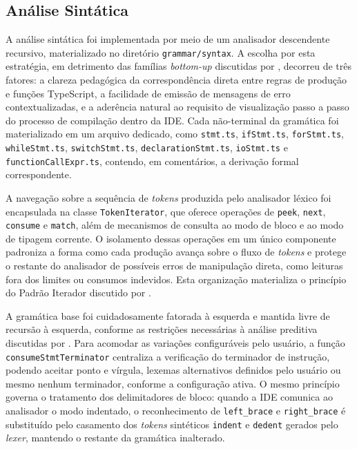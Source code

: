 \subsection{Análise Sintática}
\label{subsec:analise-sintatica}

A análise sintática foi implementada por meio de um analisador descendente recursivo, materializado no diretório \texttt{grammar/syntax}. A escolha por esta estratégia, em detrimento das famílias \textit{bottom-up} discutidas por , decorreu de três fatores: a clareza pedagógica da correspondência direta entre regras de produção e funções TypeScript, a facilidade de emissão de mensagens de erro contextualizadas, e a aderência natural ao requisito de visualização passo a passo do processo de compilação dentro da IDE. Cada não-terminal da gramática foi materializado em um arquivo dedicado, como \texttt{stmt.ts}, \texttt{ifStmt.ts}, \texttt{forStmt.ts}, \texttt{whileStmt.ts}, \texttt{switchStmt.ts}, \texttt{declarationStmt.ts}, \texttt{ioStmt.ts} e \texttt{functionCallExpr.ts}, contendo, em comentários, a derivação formal correspondente.

A navegação sobre a sequência de \textit{tokens} produzida pelo analisador léxico foi encapsulada na classe \texttt{TokenIterator}, que oferece operações de \texttt{peek}, \texttt{next}, \texttt{consume} e \texttt{match}, além de mecanismos de consulta ao modo de bloco e ao modo de tipagem corrente. O isolamento dessas operações em um único componente padroniza a forma como cada produção avança sobre o fluxo de \textit{tokens} e protege o restante do analisador de possíveis erros de manipulação direta, como leituras fora dos limites ou consumos indevidos. Esta organização materializa o princípio do Padrão Iterador discutido por .

A gramática base foi cuidadosamente fatorada à esquerda e mantida livre de recursão à esquerda, conforme as restrições necessárias à análise preditiva discutidas por . Para acomodar as variações configuráveis pelo usuário, a função \texttt{consumeStmtTerminator} centraliza a verificação do terminador de instrução, podendo aceitar ponto e vírgula, lexemas alternativos definidos pelo usuário ou mesmo nenhum terminador, conforme a configuração ativa. O mesmo princípio governa o tratamento dos delimitadores de bloco: quando a IDE comunica ao analisador o modo indentado, o reconhecimento de \texttt{left\_brace} e \texttt{right\_brace} é substituído pelo casamento dos \textit{tokens} sintéticos \texttt{indent} e \texttt{dedent} gerados pelo \textit{lexer}, mantendo o restante da gramática inalterado.

